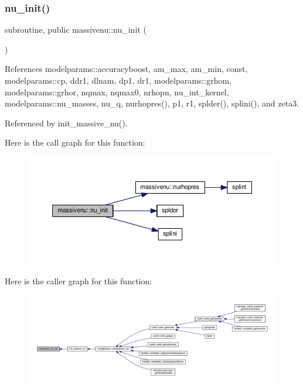 \subsubsection{\texorpdfstring{nu\+\_\+init()}{nu\_init()}}
{\footnotesize\ttfamily subroutine, public massivenu\+::nu\+\_\+init (\begin{DoxyParamCaption}{ }\end{DoxyParamCaption})}



References modelparams\+::accuracyboost, am\+\_\+max, am\+\_\+min, const, modelparams\+::cp, ddr1, dlnam, dp1, dr1, modelparams\+::grhom, modelparams\+::grhor, nqmax, nqmax0, nrhopn, nu\+\_\+int\+\_\+kernel, modelparams\+::nu\+\_\+masses, nu\+\_\+q, nurhopres(), p1, r1, splder(), splini(), and zeta3.



Referenced by init\+\_\+massive\+\_\+nu().

Here is the call graph for this function\+:
\nopagebreak
\begin{figure}[H]
\begin{center}
\leavevmode
\includegraphics[width=350pt]{namespacemassivenu_acf78f8f20c4f8c680d7f239aaffbc826_cgraph}
\end{center}
\end{figure}
Here is the caller graph for this function\+:
\nopagebreak
\begin{figure}[H]
\begin{center}
\leavevmode
\includegraphics[width=350pt]{namespacemassivenu_acf78f8f20c4f8c680d7f239aaffbc826_icgraph}
\end{center}
\end{figure}
\mbox{\label{namespacemassivenu_a5e5e907b67a43f82b29065f75a696ae5}} 
